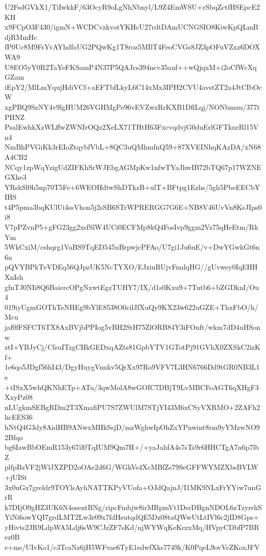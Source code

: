 U2FsdGVkX1/TiIwkkF/63OcyR9oLgNhNbnyl/L9Z4EmWSU+rSbqZctfHSEpcE2KH
x9FCpO3F430/igmN+WCDCvzkvotYKHcU27rdtDAmUCNGSIO8KiwKpQLmBdjRMmHc
fP0Uc8M9FsYvAYhdfaUG2PQwKg1T8roz5MIlT4FeoCVGs8JZ3pOFuVZxz6DOXWA9
U8EO5yY0R2TaYeFKSamP4N37P5QAJcs394ncv35auf++wQjqxM+i2oCfWcXqGZam
iEpY2/MlLmYqujHdiVCf+aEFTbfLkyL6C14xMx3IPH2CVU4avstZT2a4JtCIbOcW
xgPBQ9SzNY4v9lgHUM26VGHMgPe96vEVZwzRrKXB1DflLqj/NONbmuu/377tPHNZ
PsalEwhkXzWLffwZWNIrOQz2XeLX71THtH63FxcvqdvjG0duErlGFTknrRl15Vn4
NmBhPVGiKk3rEIoZtqybfVbL+8QC3uQMhmfnQ59+87XVEINhqKAzDA/xN68A4CB2
NCqy1zpWqYzigUdZIFKhSrWJEbgAGMpKw1nfwTYaJhwIB72bTQ67p17WZNEGXhe3
YRskSl0h5np70T5Fe+6WEOHdtwShDTkzB+ulT+BFtpg1Ezhs/5gh5PbeEECbYIHS
t4P5pma3bqKUlUi4ssVhon5j2sSB6STrWPRERGG7G6E+NB8V46UvVn8KsJIps0i8
V7pPZvnP5+gFG23gg2xsfSlW4UCi0ECFMp8kQ4FosIvp9ggm2Vz75qHeEtm/RkYm
5WkCxiM/cshqrg1VaBS9TqED545uBrpwjcPFAo/U7gi1Ju6uE/v+DwYGwkGt6n6n
pQVYBPkTvVDEq56QJpzUK5NcTYXO/EJziuRUjvFnulqHG//gUvwey0IqEHHXnIsh
gfnTJ0NIi8Q6BaiercOPgNxwtEgzTUHY7/IX/d1s0Kxu9+7Tutb6+bZGDknI/Ou4
019iyUgmGOThTeNHEg9bYlE8538O0cilJfXuQy9KX23w622uGZE+ThxFbO/h/Mcu
jaf0fFSFCT6TX8AxBVjbPPIog5vBH2StH75ZlORB84Y3iFOnft/wkm7dD4uHSonw
ztI+YBJyCj/CfsuITzgCHkGEDxqAZts81GpbYTV1GTotPj91GVhX0ZXSkC2izKf+
1e6qo5JDgf56hI43/DgyHuygVnukv5QrXx97Ro9VFV7L3HN6766Dd9tGR0NB3L1e
+tISxX5whQKNhETp+ATu/3qwMolA8wGOIC7DBjT9LvMBCFoAGT6qXHgF3XxyPz08
nLUgkmSEBgRDm2T3XmafiPU7S7ZWUlM7STjYI43M6xCSyVXRMO+2ZAFh2hcEES36
hNtQ4G3dy8AidHB9ANwxMHkSsjD/mzWghwIpOhZxYPnwint8rm9yYMzwNO92Bfqo
bg6IawBbOEmR153y67il0TqIUM9Qm7H+/+yaJahfA4s7sTs9r6HHCTgA7n6p7lbZ
plfpBzVF2jWlJXZPD2oOAe2d6G/WGhVs4XcMBfZs79SeGFFWYMZXbsBVLW+jUISt
3x0uGx7greldr9TOYlsAyhNATTKPyVUofa+OJdQajnJ/I1MK9NLxFrYYiw7unGrR
k7DIjO9gHZ3UK6N4osentBNg/ripcFmbjw8irMRpmVt1DsrDBgnNDOL6zTzyrrhS
YiNi6owYQI7grdLMT2Lw3r09x7fdHsutqdQE5Dz08taQWwUtLtIVl6c2jID8Gps+
yHivts2JR9LdpWA5Ldj6sW9CJzZF7sKd/njWYWqKeKezxMq/HVpyCDbfP7BRez0B
e+ms/UIvKo1/c3TcaNz6jH5WFvae6TyE1edwfXks7749k/K0PqeL9ovVeZKoxJFV
